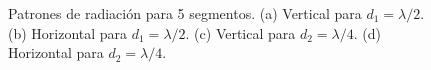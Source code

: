 \documentclass[11pt]{report}
\begin{document}
\begin{figure}[h!]
	\caption{Patrones de radiación para 5 segmentos.
		(a) Vertical para $d_1 =\lambda/2$.
		(b) Horizontal para $d_1=\lambda/2$.
		(c) Vertical para $d_2=\lambda/4$.
		(d) Horizontal para $d_2=\lambda/4$.}
\end{figure}
\end{document}
